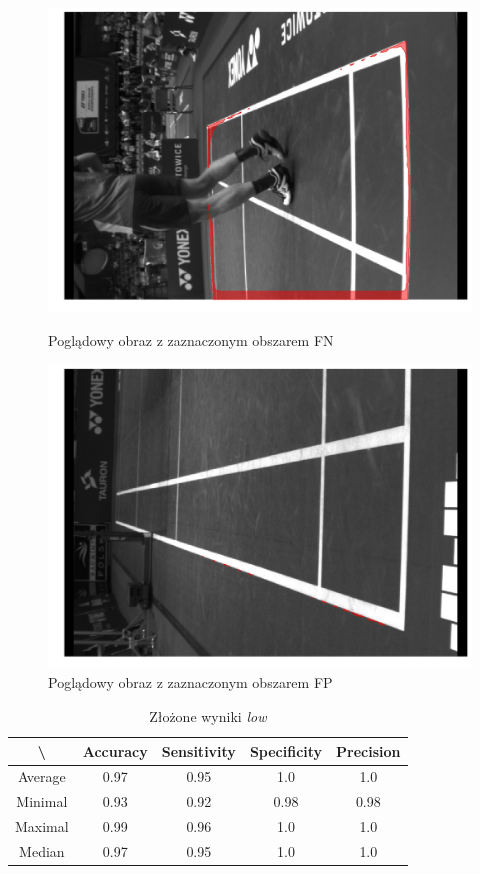 \begin{figure}[!htb]
    \includegraphics[width=\linewidth]{56_fn_1564911595553287247.jpg}
    \caption{Poglądowy obraz z zaznaczonym obszarem FN}
  \endminipage\hfill
    \includegraphics[width=\linewidth]{56_fp_1564953159296706208_5.jpg}
    \caption{Poglądowy obraz z zaznaczonym obszarem FP}
  \endminipage\hfill
\end{figure}

\vspace{1cm}

\begin{table}[!h]
	\centering
	\caption{Złożone wyniki \textit{low}}
	\vspace{6pt}
	{\footnotesize
		\begin{tabular}{|c|c|c|c|c|}
			\hline \textbackslash & Accuracy & Sensitivity & Specificity & Precision \\
      \hline Average & 0.97 & 0.95 & 1.0 & 1.0 \\
      \hline Minimal & 0.93 & 0.92 & 0.98 & 0.98 \\
      \hline Maximal & 0.99 & 0.96 & 1.0 & 1.0 \\
      \hline Median & 0.97 & 0.95 & 1.0 & 1.0 \\
      \hline
		\end{tabular}
	}
	\vspace{0pt}
\end{table}


